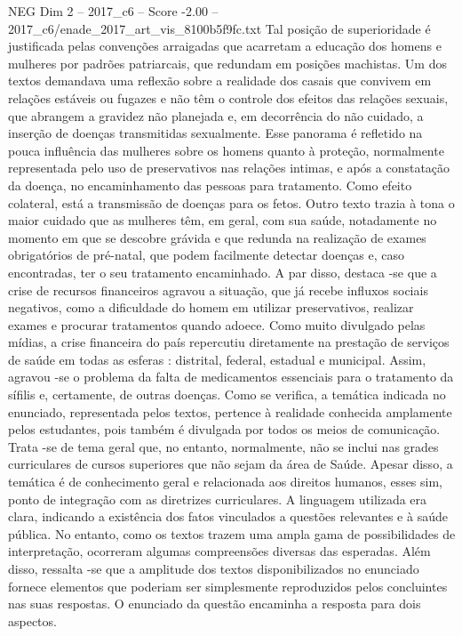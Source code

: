 \begin{textsample}{NEG Dim 2 – 2017\_c6 – Score -2.00 – 2017\_c6/enade\_2017\_art\_vis\_8100b5f9fc.txt}
Tal posição de superioridade é justificada pelas convenções arraigadas que acarretam a educação dos homens e mulheres por padrões patriarcais, que redundam em posições machistas.
Um dos textos demandava uma reflexão sobre a realidade dos casais que convivem em relações estáveis ou fugazes e não têm o controle dos efeitos das relações sexuais, que abrangem a gravidez não planejada e, em decorrência do não cuidado, a inserção de doenças transmitidas sexualmente.
Esse panorama é refletido na pouca influência das mulheres sobre os homens quanto à proteção, normalmente representada pelo uso de preservativos nas relações intimas, e após a constatação da doença, no encaminhamento das pessoas para tratamento.
Como efeito colateral, está a transmissão de doenças para os fetos.
Outro texto trazia à tona o maior cuidado que as mulheres têm, em geral, com sua saúde, notadamente no momento em que se descobre grávida e que redunda na realização de exames obrigatórios de pré-natal, que podem facilmente detectar doenças e, caso encontradas, ter o seu tratamento encaminhado.
A par disso, destaca -se que a crise de recursos financeiros agravou a situação, que já recebe influxos sociais negativos, como a dificuldade do homem em utilizar preservativos, realizar exames e procurar tratamentos quando adoece.
Como muito divulgado pelas mídias, a crise financeira do país repercutiu diretamente na prestação de serviços de saúde em todas as esferas : distrital, federal, estadual e municipal.
Assim, agravou -se o problema da falta de medicamentos essenciais para o tratamento da sífilis e, certamente, de outras doenças.
Como se verifica, a temática indicada no enunciado, representada pelos textos, pertence à realidade conhecida amplamente pelos estudantes, pois também é divulgada por todos os meios de comunicação.
Trata -se de tema geral que, no entanto, normalmente, não se inclui nas grades curriculares de cursos superiores que não sejam da área de Saúde.
Apesar disso, a temática é de conhecimento geral e relacionada aos direitos humanos, esses sim, ponto de integração com as diretrizes curriculares.
A linguagem utilizada era clara, indicando a existência dos fatos vinculados a questões relevantes e à saúde pública.
No entanto, como os textos trazem uma ampla gama de possibilidades de interpretação, ocorreram algumas compreensões diversas das esperadas.
Além disso, ressalta -se que a amplitude dos textos disponibilizados no enunciado fornece elementos que poderiam ser simplesmente reproduzidos pelos concluintes nas suas respostas.
O enunciado da questão encaminha a resposta para dois aspectos.

\end{textsample}
